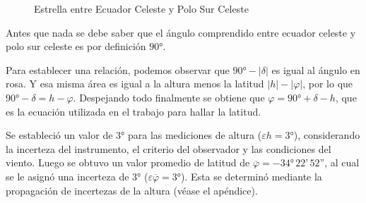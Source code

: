 \documentclass[12pt, a4paper]{article} %
\begin{document}
\begin{figure}[H]
    \centering
    \caption{Estrella entre Ecuador Celeste y Polo Sur Celeste}
    \label{fig:case-1}
\end{figure}

Antes que nada se debe saber que el ángulo comprendido entre ecuador celeste y polo sur celeste es por definición $\ang{90}$.

Para establecer una relación, podemos observar que $\ang{90}-|\delta|$ es igual al ángulo en rosa. Y esa misma área es igual a la altura menos la latitud $|h|-|\varphi|$, por lo que $\ang{90}-\delta = h-\varphi$. Despejando todo finalmente se obtiene que $\varphi=\ang{90}+\delta - h$, que es la ecuación utilizada en el trabajo para hallar la latitud. 

Se estableció un valor de $\ang{3}$ para las mediciones de altura ($\varepsilon h = \ang{3}$), considerando la incerteza del instrumento, el criterio del observador y las condiciones del viento. Luego se obtuvo un valor promedio de latitud de $\overline{\varphi} = -\ang{34} \,22\text{'}\, 52\text{''}$, al cual se le asignó una incerteza de $\ang{3}$ ($\varepsilon \overline{\varphi}=\ang{3}$). Esta se determinó  mediante la propagación de incertezas de la altura (véase el apéndice).
\end{document}
